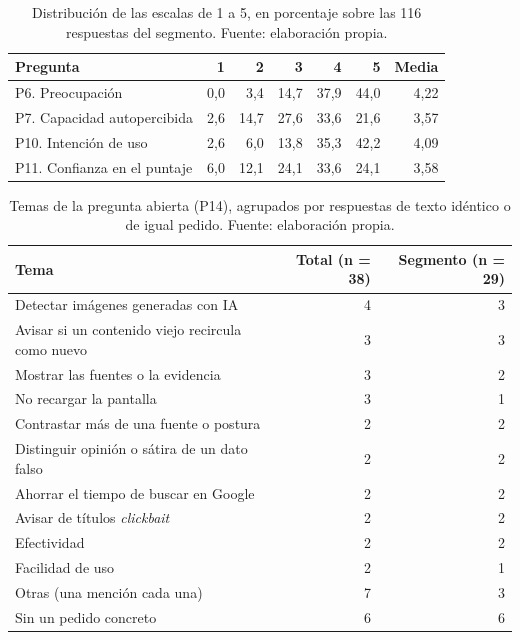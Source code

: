 \begin{table}[t]
  \centering\small
  \caption{Distribución de las escalas de 1 a 5, en porcentaje sobre las 116 respuestas del segmento. Fuente: elaboración propia.}
  \label{tab:enc-likert}
  \begin{tabular}{lrrrrrr}
    \hline
    \textbf{Pregunta} & \textbf{1} & \textbf{2} & \textbf{3} & \textbf{4} & \textbf{5} & \textbf{Media} \\
    \hline
    P6. Preocupación & 0,0 & 3,4 & 14,7 & 37,9 & 44,0 & 4,22 \\
    P7. Capacidad autopercibida & 2,6 & 14,7 & 27,6 & 33,6 & 21,6 & 3,57 \\
    P10. Intención de uso & 2,6 & 6,0 & 13,8 & 35,3 & 42,2 & 4,09 \\
    P11. Confianza en el puntaje & 6,0 & 12,1 & 24,1 & 33,6 & 24,1 & 3,58 \\
    \hline
  \end{tabular}
\end{table}

\begin{table}[t]
  \centering\small
  \caption{Temas de la pregunta abierta (P14), agrupados por respuestas de texto idéntico o de igual pedido. Fuente: elaboración propia.}
  \label{tab:enc-temas}
  \begin{tabular}{lrr}
    \hline
    \textbf{Tema} & \textbf{Total (n = 38)} & \textbf{Segmento (n = 29)} \\
    \hline
    Detectar imágenes generadas con IA & 4 & 3 \\
    Avisar si un contenido viejo recircula como nuevo & 3 & 3 \\
    Mostrar las fuentes o la evidencia & 3 & 2 \\
    No recargar la pantalla & 3 & 1 \\
    Contrastar más de una fuente o postura & 2 & 2 \\
    Distinguir opinión o sátira de un dato falso & 2 & 2 \\
    Ahorrar el tiempo de buscar en Google & 2 & 2 \\
    Avisar de títulos \textit{clickbait} & 2 & 2 \\
    Efectividad & 2 & 2 \\
    Facilidad de uso & 2 & 1 \\
    Otras (una mención cada una) & 7 & 3 \\
    Sin un pedido concreto & 6 & 6 \\
    \hline
  \end{tabular}
\end{table}
